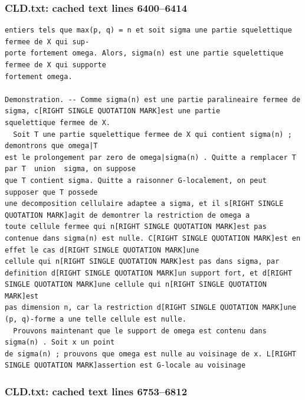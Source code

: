 \documentclass[
  11pt,
]{article}
\begin{document}
\subsubsection{CLD.txt: cached text lines
6400--6414}\label{cld.txt-cached-text-lines-64006414}

\begin{lstlisting}
entiers tels que max(p, q) = n et soit sigma une partie squelettique fermee de X qui sup-
porte fortement omega. Alors, sigma(n) est une partie squelettique fermee de X qui supporte
fortement omega.

Demonstration. -- Comme sigma(n) est une partie paralineaire fermee de sigma, c[RIGHT SINGLE QUOTATION MARK]est une partie
squelettique fermee de X.
  Soit T une partie squelettique fermee de X qui contient sigma(n) ; demontrons que omega|T
est le prolongement par zero de omega|sigma(n) . Quitte a remplacer T par T  union  sigma, on suppose
que T contient sigma. Quitte a raisonner G-localement, on peut supposer que T possede
une decomposition cellulaire adaptee a sigma, et il s[RIGHT SINGLE QUOTATION MARK]agit de demontrer la restriction de omega a
toute cellule fermee qui n[RIGHT SINGLE QUOTATION MARK]est pas contenue dans sigma(n) est nulle. C[RIGHT SINGLE QUOTATION MARK]est en effet le cas d[RIGHT SINGLE QUOTATION MARK]une
cellule qui n[RIGHT SINGLE QUOTATION MARK]est pas dans sigma, par definition d[RIGHT SINGLE QUOTATION MARK]un support fort, et d[RIGHT SINGLE QUOTATION MARK]une cellule qui n[RIGHT SINGLE QUOTATION MARK]est
pas dimension n, car la restriction d[RIGHT SINGLE QUOTATION MARK]une (p, q)-forme a une telle cellule est nulle.
  Prouvons maintenant que le support de omega est contenu dans sigma(n) . Soit x un point
de sigma(n) ; prouvons que omega est nulle au voisinage de x. L[RIGHT SINGLE QUOTATION MARK]assertion est G-locale au voisinage
\end{lstlisting}

\subsubsection{CLD.txt: cached text lines
6753--6812}\label{cld.txt-cached-text-lines-67536812}
\end{document}
